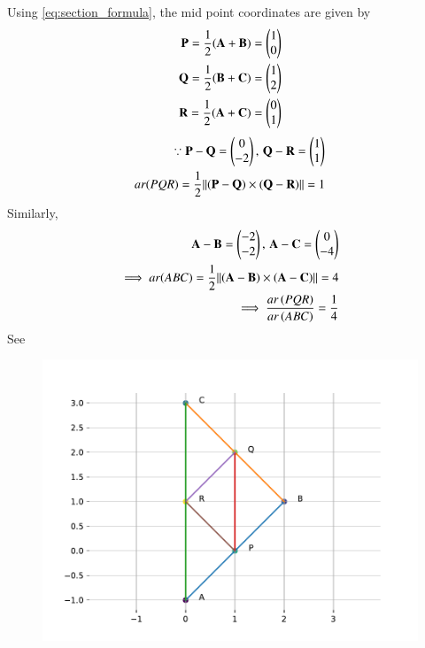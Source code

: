 Using 
	  \eqref{eq:section_formula},
the mid point coordinates are given by
	\begin{align}
		\mathbf{P} = \frac{1}{2}\mathbf(\mathbf{A}+\mathbf{B})  = \begin{pmatrix}1\\0\end{pmatrix}\\
		\mathbf{Q} = \frac{1}{2}\mathbf(\mathbf{B}+\mathbf{C}) = \begin{pmatrix}1\\2\end{pmatrix}\\
		\mathbf{R} = \frac{1}{2}\mathbf(\mathbf{A}+\mathbf{C}) = \begin{pmatrix}0\\1\end{pmatrix}
	\end{align}
	\begin{align}
\because		\mathbf{P}-\mathbf{Q} =  \begin{pmatrix}
 0 \\
 -2 
 \end{pmatrix},\,
		\mathbf{Q}-\mathbf{R} =   \begin{pmatrix}
 1 \\
 1 
 \end{pmatrix}
 \\
		ar(PQR)=\frac{1}{2}{\left\lVert\mathbf(\mathbf{P}-\mathbf{Q})\times\mathbf(\mathbf{Q}-\mathbf{R})\right\rVert}
		=1
	\end{align}
	Similarly, 
	\begin{align}
		\mathbf{A}-\mathbf{B} = \begin{pmatrix}
 -2 \\
 -2 
 \end{pmatrix}
 ,\,
		\mathbf{A}-\mathbf{C} =  \begin{pmatrix}
 0 \\
 -4 
 \end{pmatrix}
 \\
 \implies
		ar(ABC)=\frac{1}{2}{\left\lVert\mathbf(\mathbf{A}-\mathbf{B})\times\mathbf(\mathbf{A}-\mathbf{C})\right\rVert}
=4
\\
		\implies \frac{ar\left(PQR\right)}{ar\left(ABC\right)} = \frac{1}{4}
	\end{align}
	See 
\begin{figure}[H]
	\begin{center} 
	    \includegraphics[width=0.75\columnwidth]{chapters/10/7/3/3/figs/fig.pdf}
	\end{center}
\caption{}
\label{fig:10/7/3/3Fig}
\end{figure}
